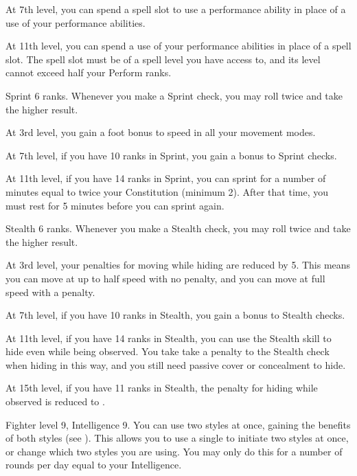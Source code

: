     At 7th level, you can spend a spell slot to use a performance ability in place of a use of your performance abilities.

    At 11th level, you can spend a use of your performance abilities in place of a spell slot.
    The spell slot must be of a spell level you have access to, and its level cannot exceed half your Perform ranks.

    \featpre Sprint 6 ranks.
    \featben Whenever you make a Sprint check, you may roll twice and take the higher result.

    At 3rd level, you gain a  foot bonus to speed in all your movement modes.

    At 7th level, if you have 10 ranks in Sprint, you gain a  bonus to Sprint checks.

    At 11th level, if you have 14 ranks in Sprint, you can sprint for a number of minutes equal to twice your Constitution (minimum 2).
    After that time, you must rest for 5 minutes before you can sprint again.

    \featpre Stealth 6 ranks.
    \featben Whenever you make a Stealth check, you may roll twice and take the higher result.

    At 3rd level, your penalties for moving while hiding are reduced by 5.
    This means you can move at up to half speed with no penalty, and you can move at full speed with a  penalty.

    At 7th level, if you have 10 ranks in Stealth, you gain a  bonus to Stealth checks.

    At 11th level, if you have 14 ranks in Stealth, you can use the Stealth skill to hide even while being observed.
    You take take a  penalty to the Stealth check when hiding in this way, and you still need passive cover or concealment to hide.

    At 15th level, if you have 11 ranks in Stealth, the penalty for hiding while observed is reduced to .

    \featpre Fighter level 9, Intelligence 9.
    \featben You can use two styles at once, gaining the benefits of both styles (see ).
    This allows you to use a single  to initiate two styles at once, or change which two styles you are using.
    You may only do this for a number of rounds per day equal to your Intelligence.

